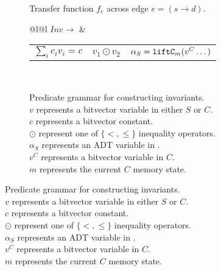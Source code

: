 \begin{figure}[t]
\begin{center}
\begin{subfigure}[t]{.46\textwidth}
\begin{algorithm}[H]
\begin{footnotesize}
\SetAlgoLined
{}
\end{footnotesize}
\end{algorithm}
\caption{\label{algo:tf} Transfer function $f_e$ across
edge $e=(s\rightarrow d)$.}
\end{subfigure}%
\hfill
{}
\hfill
\begin{subfigure}[t]{.52\textwidth}
\begin{center}
\begin{tabular}{@{}l@{}l}
$Inv \rightarrow$ &
\begin{tabular}{@{}l|l|l@{}}
$\sum_{i}{c_iv_i}=c$ & $v_1 \odot v_2$ & $\alpha_S = {\tt liftC}_m(v^{C} \dots)$
\end{tabular}\\
\end{tabular}%
\vspace{7px}
\end{center}
\caption{\label{fig:invGrammar} Predicate grammar for constructing invariants.\\$v$ represents a bitvector variable in either $S$ or $C$. \\ $c$ represents a bitvector constant.\\$\odot$ represent one of $\{<,\leq\}$ inequality operators.\\$\alpha_S$ represents an ADT variable in \SpecL{}.\\$v^{C}$ represents a bitvector variable in $C$.\\$m$ represents the current $C$ memory state.}

\end{subfigure}
\end{center}
\end{figure}
